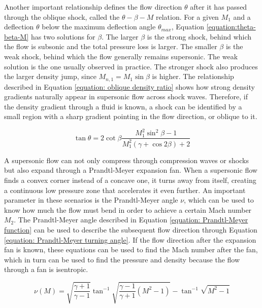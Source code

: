 \par Another important relationship defines the flow direction $\theta$ after it has passed through the oblique shock, called the $\theta-\beta-M$ relation. For a given $M_1$ and a deflection $\theta$ below the maximum deflection angle $\theta_{max}$, Equation \ref{equation:theta-beta-M} has two solutions for $\beta$. The larger $\beta$ is the strong shock, behind which the flow is subsonic and the total pressure loss is larger. The smaller $\beta$ is the weak shock, behind which the flow generally remains supersonic. The weak solution is the one usually observed in practice. The stronger shock also produces the larger density jump, since $M_{n,1} = M_1 \sin\beta$ is higher. The relationship described in Equation \ref{equation: oblique density ratio} shows how strong density gradients naturally appear in supersonic flow across shock waves. Therefore, if the density gradient through a fluid is known, a shock can be identified by a small region with a sharp gradient pointing in the flow direction, or oblique to it.

\begin{equation}
\label{equation:theta-beta-M}
    \tan \theta = 2 \cot \beta \frac{M_1^2\sin^2\beta -1}{M_1^2(\gamma +\cos 2\beta )+2}
\end{equation}

\par A supersonic flow can not only compress through compression waves or shocks but also expand through a Prandtl-Meyer expansion fan. When a supersonic flow finds a convex corner instead of a concave one, it turns away from itself, creating a continuous low pressure zone that accelerates it even further. An important parameter in these scenarios is the Prandtl-Meyer angle $\nu$, which can be used to know how much the flow must bend in order to achieve a certain Mach number $M_2$. The Prandtl-Meyer angle described in Equation \ref{equation: Prandtl-Meyer function} can be used to describe the subsequent flow direction through Equation \ref{equation: Prandtl-Meyer turning angle}. If the flow direction after the expansion fan is known, these equations can be used to find the Mach number after the fan, which in turn can be used to find the pressure and density because the flow through a fan is isentropic.

\begin{equation}
\label{equation: Prandtl-Meyer function}
    \nu(M) = \sqrt{\frac{\gamma + 1}{\gamma - 1}} \tan^{-1} \sqrt{\frac{\gamma - 1}{\gamma + 1}\left(M^2 - 1\right)} - \tan^{-1} \sqrt{M^2 - 1}
\end{equation}

